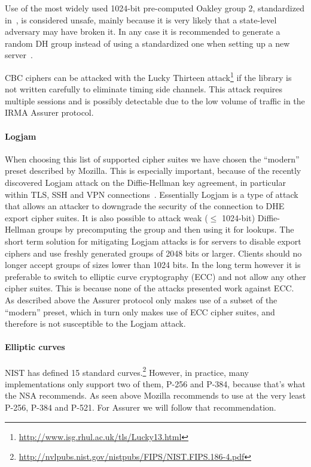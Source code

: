 Use of the most widely used 1024-bit pre-computed Oakley group 2, standardized in~\cite{ike}, is considered unsafe, mainly because it is very likely that a state-level adversary may have broken it. In any case it is recommended to generate a random DH group instead of using a standardized one when setting up a new server~\cite{logjam}.

CBC ciphers can be attacked with the Lucky Thirteen attack\footnote{\url{http://www.isg.rhul.ac.uk/tls/Lucky13.html}} if the library is not written carefully to eliminate timing side channels. This attack requires multiple sessions and is possibly detectable due to the low volume of traffic in the IRMA Assurer protocol.

\paragraph{Logjam}
When choosing this list of supported cipher suites we have chosen the ``modern'' preset described by Mozilla. This is especially important, because of the recently discovered Logjam attack on the Diffie-Hellman key agreement, in particular within TLS, SSH and VPN connections~\cite{logjam}. Essentially Logjam is a type of attack that allows an attacker to downgrade the security of the connection to DHE export cipher suites. It is also possible to attack weak ($\leq$ 1024-bit) Diffie-Hellman groups by precomputing the group and then using it for lookups. The short term solution for mitigating Logjam attacks is for servers to disable export ciphers and use freshly generated groups of 2048 bits or larger. Clients should no longer accept groups of sizes lower than 1024 bits. In the long term however it is preferable to switch to elliptic curve cryptography (ECC) and not allow any other cipher suites. This is because none of the attacks presented work against ECC. As described above the Assurer protocol only makes use of a subset of the ``modern'' preset, which in turn only makes use of ECC cipher suites, and therefore is not susceptible to the Logjam attack.

\paragraph{Elliptic curves}
NIST has defined 15 standard curves.\footnote{\url{http://nvlpubs.nist.gov/nistpubs/FIPS/NIST.FIPS.186-4.pdf}} However, in practice, many implementations only support two of them, P-256 and P-384, because that's what the NSA recommends. As seen above Mozilla recommends to use at the very least P-256, P-384 and P-521. For Assurer we will follow that recommendation.

